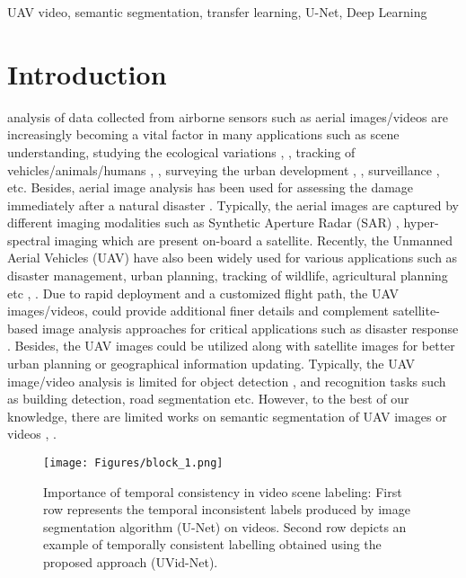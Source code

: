 \documentclass[journal]{IEEEtran}
\begin{document}
\begin{IEEEkeywords}
UAV video, semantic segmentation, transfer learning, U-Net, Deep Learning
\end{IEEEkeywords}






\IEEEpeerreviewmaketitle



\section{Introduction}
 analysis of data collected from airborne sensors such as aerial images/videos are increasingly becoming a vital factor in many applications such as scene understanding, studying the ecological variations \cite{35}, \cite{pai2019automatic}, tracking of vehicles/animals/humans \cite{38},  \cite{40}, \cite{36} surveying the urban development \cite{35}, \cite{42}, surveillance \cite{41}, etc. Besides, aerial image analysis has been used for assessing the damage immediately after a natural disaster \cite{43}. Typically, the aerial images are captured by different imaging modalities such as Synthetic Aperture Radar (SAR) \cite{37}, hyper-spectral imaging \cite{39} which are present on-board a satellite. Recently, the Unmanned Aerial Vehicles (UAV) have also been widely used for various applications such as disaster management, urban planning, tracking of wildlife, agricultural planning etc \cite{bergsma2019operational}, \cite{bulatov2011context}. Due to rapid deployment and a customized flight path, the UAV images/videos, could provide additional finer details and complement satellite-based image analysis approaches for critical applications such as disaster response \cite{luo2019unmanned}. Besides, the UAV images could be utilized along with satellite images for better urban planning or geographical information updating. Typically, the UAV image/video analysis is limited for object detection \cite{fang2011improved}, \cite{7938673} and recognition \cite{wang2012framework} tasks such as building detection, road segmentation etc. However, to the best of our knowledge, there are limited works on semantic segmentation of UAV images or videos \cite{semantic}, \cite{wang2019deep}.
\begin{figure}[tbp]
	\begin{center}
		\texttt{[image: Figures/block\_1.png]}
	\end{center}
	
	\caption{ Importance of temporal consistency in video scene labeling: First row represents the temporal inconsistent labels produced by image segmentation algorithm (U-Net) on videos. Second row depicts an example of temporally consistent labelling obtained using the proposed approach (UVid-Net).}
	\label{fig:1}
	
\end{figure}
\end{document}
